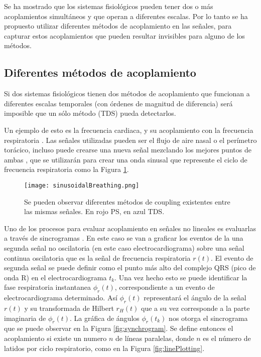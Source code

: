 \documentclass[twoside,twocolumn]{article}
\begin{document}
Se ha mostrado que los sistemas fisiológicos pueden tener dos o más acoplamientos simultáneos y que operan a diferentes escalas.
Por lo tanto se ha propuesto utilizar diferentes métodos de acoplamiento en las señales, para capturar estos acoplamientos que pueden resultar invisibles para alguno de los métodos.

\subsection{Diferentes métodos de acoplamiento}
Si dos sistemas fisiológicos tienen dos métodos de acoplamiento que funcionan a diferentes escalas temporales (con órdenes de magnitud de diferencia) será imposible que un sólo método (TDS) pueda detectarlos.

Un ejemplo de esto es la frecuencia cardiaca, y su acoplamiento con la frecuencia respiratoria \cite{bartsch2014coexisting}.
Las señales utilizadas pueden ser el flujo de aire nasal o el perímetro torácico, incluso puede crearse una nueva señal mezclando los mejores puntos de ambas \cite{bartsch2014coexisting}, que se utilizarán para crear una onda sinusal que represente el ciclo de frecuencia respiratoria como la Figura \ref{fig:sinusoidalBreathing}.
\begin{figure}[H]
  \texttt{[image: sinusoidalBreathing.png]}
  \caption{Se pueden observar diferentes métodos de coupling existentes entre las mismas señales. En rojo PS, en azul TDS.}
  \label{fig:sinusoidalBreathing}
\end{figure}
Uno de los procesos para evaluar acoplamiento en señales no lineales es evaluarlas a través de sincrogramas \cite{bartsch2014coexisting}.
En este caso se van a graficar los eventos de la una segunda señal no oscilatoria (en este caso electrocardiograma) sobre una señal continua oscilatoria que es la señal de frecuencia respiratoria $r(t)$. El evento de segunda señal se puede definir como el punto más alto del complejo QRS (pico de onda R) en el electrocardiograma $t_k$.
Una vez hecho esto se puede identificar la fase respiratoria instantanea $\phi_r(t)$, correspondiente a un evento de electrocardiograma determinado. Así  $\phi_r(t)$ representará el ángulo de la señal $r(t)$ y su transformada de Hilbert $r_H(t)$ que a su vez corresponde a la parte imaginaria de $\phi_r(t)$.
La gráfica de ángulos $\phi_r(t_k)$ nos otorga el sincrograma que se puede observar en la Figura \ref{fig:synchrogram}. Se define entonces el acoplamiento si existe un numero $n$ de líneas paralelas, donde $n$ es el número de latidos por ciclo respiratorio, como en la Figura \ref{fig:linePlotting}.
\end{document}
